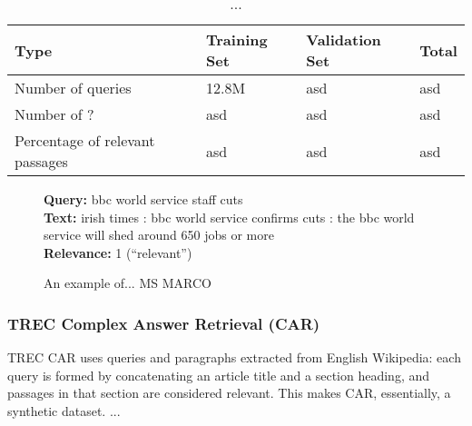 \begin{table}[b]
\vspace{0.2cm}
\centering
\begin{tabular}{llll}
\toprule
\textbf{Type} \mbox{\hspace{0.5cm}} & \textbf{Training Set} \mbox{\hspace{1.0cm}} & \textbf{Validation Set} \mbox{\hspace{1.0cm}} & \textbf{Total} \mbox{\hspace{1.0cm}} \\
\toprule
Number of queries & 12.8M & asd & asd \\
Number  of ? & asd & asd & asd \\
Percentage of relevant passages  & asd      & asd & asd   \\
\bottomrule
\end{tabular}
\vspace{0.2cm}
\caption{...}%
\label{tab:marco-stats}
\vspace{-0.6cm}
\end{table}

\begin{figure}[b!]
	\begin{framed}
		\centering
    		\textbf{Query:} bbc world service staff cuts \\
    		\textbf{Text:} irish times : bbc world service confirms cuts : the bbc world service will shed around 650 jobs or more \\
    		\textbf{Relevance:} 1 (``relevant'')
	\end{framed}
\label{marco-example}
 \caption{An example of... MS MARCO}
\end{figure}

\subsubsection{TREC Complex Answer Retrieval (CAR)}

TREC CAR \cite{dietz2017trec} uses queries and paragraphs extracted from English Wikipedia: each query is formed by concatenating an article title and a section heading, and passages in that section are considered relevant.
This makes CAR, essentially, a synthetic dataset.
...

